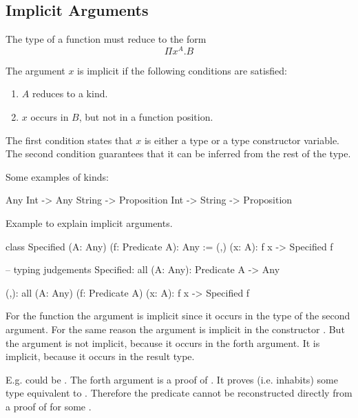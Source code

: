 \subsection{Implicit Arguments}


The type of a function must reduce to the form
$$
    \Pi x^A. B
$$

The argument $x$ is implicit if the following conditions are satisfied:

\begin{enumerate}

\item $A$ reduces to a kind.

\item $x$ occurs in $B$, but not in a function position.
\end{enumerate}

The first condition states that $x$ is either a type or a type constructor
variable. The second condition guarantees that it can be inferred from the rest
of the type.

\noindent Some examples of kinds:
\begin{alba}
    Any
    Int -> Any
    String -> Proposition
    Int -> String -> Proposition
\end{alba}


\noindent Example to explain implicit arguments.
\begin{alba}
class
    Specified (A: Any) (f: Predicate A): Any
:=
    (,) (x: A): f x -> Specified f

-- typing judgements
Specified: all (A: Any): Predicate A -> Any

(,): all (A: Any) (f: Predicate A) (x: A): f x -> Specified f
\end{alba}

For the function  the argument  is implicit since it
occurs in the type of the second argument. For the same reason the argument
 is implicit in the constructor \code{(,)}. But the argument  is
not implicit, because it occurs in the forth argument. It is implicit, because
it occurs in the result type.

E.g.  could be . The forth argument is a proof of
. It proves (i.e. inhabits) some type equivalent to
.  Therefore the predicate  cannot be
reconstructed directly from a proof of  for some .








